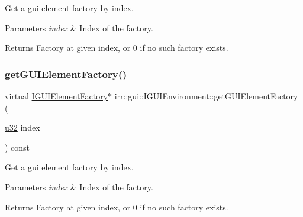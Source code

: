 Get a gui element factory by index. 


\begin{DoxyParams}{Parameters}
{\em index} & Index of the factory. \\
\hline
\end{DoxyParams}
\begin{DoxyReturn}{Returns}
Factory at given index, or 0 if no such factory exists. 
\end{DoxyReturn}
\mbox{\label{classirr_1_1gui_1_1IGUIEnvironment_a3c1ec1c13e7339e2e8abb34276d6288f}} 
\subsubsection{\texorpdfstring{get\+G\+U\+I\+Element\+Factory()}{getGUIElementFactory()}\hspace{0.1cm}{\footnotesize\ttfamily [2/2]}}
{\footnotesize\ttfamily virtual \hyperlink{classirr_1_1gui_1_1IGUIElementFactory}{I\+G\+U\+I\+Element\+Factory}$\ast$ irr\+::gui\+::\+I\+G\+U\+I\+Environment\+::get\+G\+U\+I\+Element\+Factory (\begin{DoxyParamCaption}\item[{\hyperlink{namespaceirr_a0416a53257075833e7002efd0a18e804}{u32}}]{index }\end{DoxyParamCaption}) const\hspace{0.3cm}{\ttfamily [pure virtual]}}



Get a gui element factory by index. 


\begin{DoxyParams}{Parameters}
{\em index} & Index of the factory. \\
\hline
\end{DoxyParams}
\begin{DoxyReturn}{Returns}
Factory at given index, or 0 if no such factory exists. 
\end{DoxyReturn}
\mbox{\label{classirr_1_1gui_1_1IGUIEnvironment_a00fa645d517a276553b78fc1d0e78591}} 
